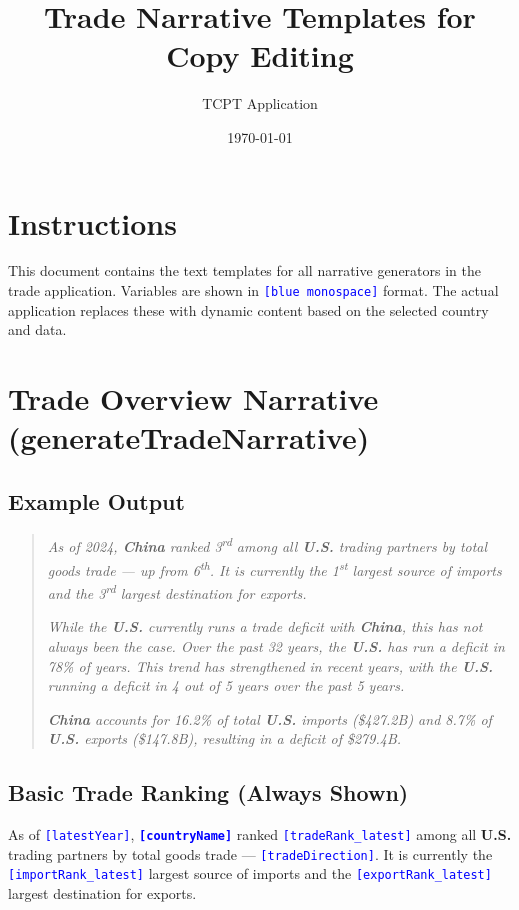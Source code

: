 \documentclass[12pt]{article}
\title{Trade Narrative Templates for Copy Editing}
\author{TCPT Application}
\date{\today}
\newcommand{\var}[1]{\textcolor{blue}{\texttt{[#1]}}}
\newcommand{\bold}[1]{\textbf{#1}}
\begin{document}
\maketitle

\section*{Instructions}
This document contains the text templates for all narrative generators in the trade application. Variables are shown in \var{blue monospace} format. The actual application replaces these with dynamic content based on the selected country and data.

\section{Trade Overview Narrative (generateTradeNarrative)}

\subsection{Example Output}
\begin{quote}
\textit{As of 2024, \textbf{China} ranked 3\textsuperscript{rd} among all \textbf{U.S.} trading partners by total goods trade — up from 6\textsuperscript{th}. It is currently the 1\textsuperscript{st} largest source of imports and the 3\textsuperscript{rd} largest destination for exports.}

\textit{While the \textbf{U.S.} currently runs a trade deficit with \textbf{China}, this has not always been the case. Over the past 32 years, the \textbf{U.S.} has run a deficit in 78\% of years. This trend has strengthened in recent years, with the \textbf{U.S.} running a deficit in 4 out of 5 years over the past 5 years.}

\textit{\textbf{China} accounts for 16.2\% of total \textbf{U.S.} imports (\$427.2B) and 8.7\% of \textbf{U.S.} exports (\$147.8B), resulting in a deficit of \$279.4B.}
\end{quote}

\subsection{Basic Trade Ranking (Always Shown)}
As of \var{latestYear}, \bold{\var{countryName}} ranked \var{tradeRank\_latest} among all \bold{U.S.} trading partners by total goods trade — \var{tradeDirection}. It is currently the \var{importRank\_latest} largest source of imports and the \var{exportRank\_latest} largest destination for exports.
\end{document}
